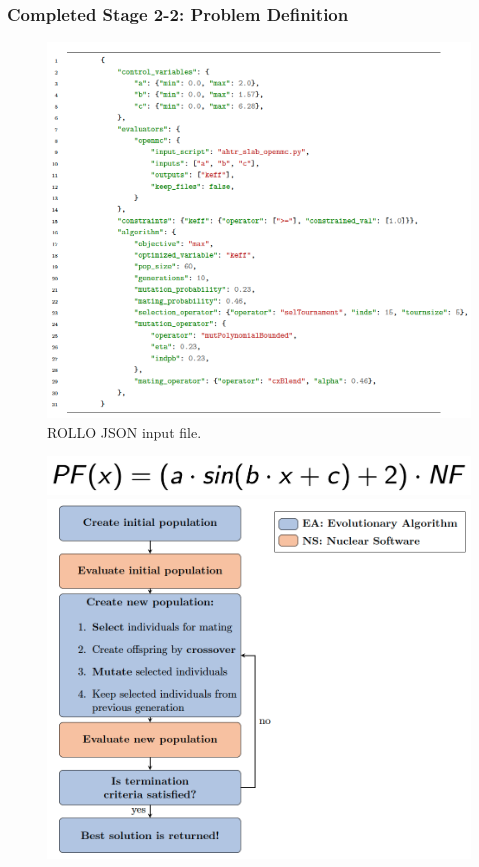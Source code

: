 \begin{frame}
    \frametitle{Completed Stage 2-2: Problem Definition}
    \begin{minipage}[c]{0.6\textwidth}
    \begin{figure}
        \includegraphics[width=0.9\linewidth]{figures/ii2-rollo-input.png}
        \caption{ROLLO JSON input file.}
    \end{figure}
\end{minipage}\hfill
    \begin{minipage}[c]{0.4\textwidth}
        \centering
        \begin{figure}
            \includegraphics[width=\linewidth]{figures/equation.png}
            \vspace{0.5cm}
            \includegraphics[width=\linewidth]{figures/rollo-flow.png} 

\end{figure}
\end{minipage}
\end{frame}
